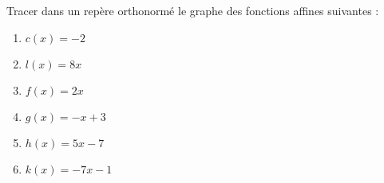 
\begin{exercice}\label{exosmath-0513}

    Tracer dans un repère orthonormé le graphe des fonctions affines suivantes :
    \begin{multicols}{2}
        \begin{enumerate}
            \item
                \( c(x)=-2\)
            \item
                \( l(x)=8x\)
            \item
                \( f(x)=2x\)
            \item
                \( g(x)=-x+3\)
            \item
                \( h(x)=5x-7\)
            \item
                \( k(x)=-7x-1\)
        \end{enumerate}
    \end{multicols}

\end{exercice}
